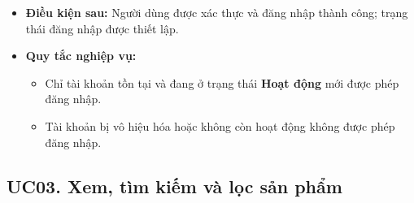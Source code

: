 \documentclass[12pt,a4paper]{article}
\begin{document}
\begin{itemize}
\begin{itemize}
        \item Nếu tài khoản ở trạng thái \textbf{Bị vô hiệu hóa}, hệ thống thông báo tài khoản đã bị vô hiệu hóa và từ chối đăng nhập.
        \item Nếu không thể thiết lập trạng thái đăng nhập, hệ thống thông báo xảy ra lỗi trong quá trình đăng nhập và yêu cầu người dùng thực hiện lại.
    \end{itemize}
    \item \textbf{Điều kiện sau:} Người dùng được xác thực và đăng nhập thành công; trạng thái đăng nhập được thiết lập.
    \item \textbf{Quy tắc nghiệp vụ:}
    \begin{itemize}
        \item Chỉ tài khoản tồn tại và đang ở trạng thái \textbf{Hoạt động} mới được phép đăng nhập.
        \item Tài khoản bị vô hiệu hóa hoặc không còn hoạt động không được phép đăng nhập.
    \end{itemize}
\end{itemize}


\subsection*{UC03. Xem, tìm kiếm và lọc sản phẩm}
\end{document}
